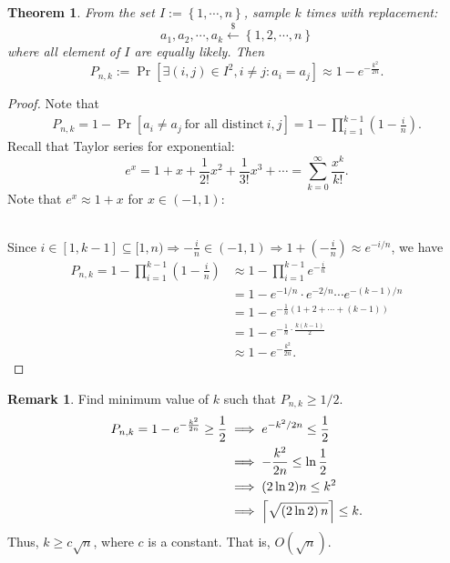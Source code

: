 \documentclass[12pt,openany]{book}
\DeclarePairedDelimiter{\ceil}{\lceil}{\rceil}
\newtheorem{theorem}{Theorem}[chapter]
\theoremstyle{definition}
\newtheorem{remark}{Remark}[chapter]
\newcommand{\set}[1]{\left\{#1\right\}}
\newcommand{\of}[1]{\left( #1 \right)}
\newcommand{\dollar}{\$}
\newcommand{\uniform}{\xleftarrow{\dollar}}
\begin{document}
	\newpage
	\begin{tcolorbox}[colback=white,colframe=thmcolor,arc=5pt,title={\color{white}\bf Birthday Bound}]
		\begin{theorem}
			From the set $I:=\set{1,\cdots,n}$, sample $k$ times with replacement: \[
			a_1,a_2,\cdots,a_k\uniform\set{1,2,\cdots,n}
			\] where all element of $I$ are equally likely. Then \[
			P_{n,k}:=\Pr\left[\exists \of{i,j}\in I^2, i\neq j:a_i=a_j\right]\approx 1-e^{-\frac{k^2}{2n}}.
			\]
		\end{theorem}
	\end{tcolorbox}
	\begin{proof}
		Note that \begin{align*}
		P_{n,k}=1-\Pr[a_i\neq a_j\ \text{for all distinct}\ i,j]=1-\prod_{i=1}^{k-1}\of{1-\frac{i}{n}}.
		\end{align*} Recall that Taylor series for exponential: \[
		e^x=1+x+\frac{1}{2!}x^2+\frac{1}{3!}x^3+\cdots=\sum_{k=0}^{\infty}\frac{x^k}{k!}.
		\] Note that $e^x\approx1+x$ for $x\in(-1,1)$:
		\begin{figure}[ht!]
			\centering
		\end{figure}\\
		Since $i\in[1,k-1]\subseteq[1,n)\Rightarrow-\frac{i}{n}\in\of{-1,1}\Rightarrow 1+\of{-\frac{i}{n}}\approx e^{-i/n}$, we have \begin{align*}
		P_{n,k}=
		1-\prod_{i=1}^{k-1}\of{1-\frac{i}{n}}
		&\approx 1-\prod_{i=1}^{k-1}e^{-\frac{i}{n}}\\
		&=1-e^{-1/n}\cdot e^{-2/n}\cdots e^{-(k-1)/n}\\
		&=1-e^{-\frac{1}{n}\of{1+2+\cdots+(k-1)}}\\
		&=1-e^{-\frac{1}{n}\cdot\frac{k\of{k-1}}{2}}\\
		&\approx 1-e^{-\frac{k^2}{2n}}.
		\end{align*}
	\end{proof}
	
	\begin{remark}
		Find minimum value of $k$ such that $P_{n,k}\geq 1/2$. \begin{align*}
		P_{n,k}=1-e^{-\frac{k^2}{2n}}\geq\frac{1}{2}&\implies e^{-k^2/2n}\leq\frac{1}{2}\\
		&\implies-\frac{k^2}{2n}\leq\ln\frac{1}{2}\\
		&\implies (2\ln2)n\leq k^2\\
		&\implies \ceil*{\sqrt{\of{2\ln 2}n}}\leq k.
		\end{align*} 
		Thus, $k\geq c\sqrt{n}$, where $c$ is a constant. That is, $O(\sqrt{n})$.
	\end{remark}
	
\end{document}
